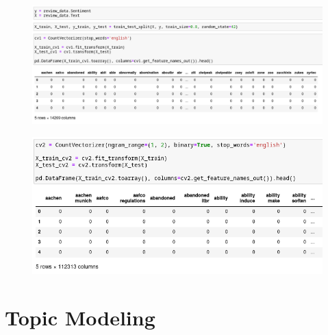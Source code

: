 \documentclass{beamer}
\begin{document}
\begin{frame}
    \begin{figure}
        \includegraphics[width=\textwidth]{../figures/sent_cv1.png}
    \end{figure}
\end{frame}

\begin{frame}
    \begin{figure}
        \includegraphics[width=\textwidth]{../figures/sent_cv2.png}
    \end{figure}
\end{frame}

\section{Topic Modeling}
\end{document}
